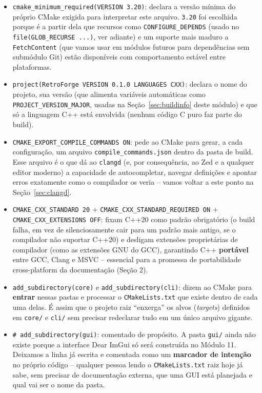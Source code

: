 \begin{itemize}
    \item \texttt{cmake\_minimum\_required(VERSION 3.20)}: declara a versão mínima do próprio CMake exigida para interpretar este arquivo. \texttt{3.20} foi escolhida porque é a partir dela que recursos como \texttt{CONFIGURE\_DEPENDS} (usado no \texttt{file(GLOB\_RECURSE ...)}, ver adiante) e um suporte mais maduro a \texttt{FetchContent} (que vamos usar em módulos futuros para dependências sem submódulo Git) estão disponíveis com comportamento estável entre plataformas.
    \item \texttt{project(RetroForge VERSION 0.1.0 LANGUAGES CXX)}: declara o nome do projeto, sua versão (que alimenta variáveis automáticas como \texttt{PROJECT\_VERSION\_MAJOR}, usadas na Seção~\ref{sec:buildinfo} deste módulo) e que só a linguagem C++ está envolvida (nenhum código C puro faz parte do build).
    \item \texttt{CMAKE\_EXPORT\_COMPILE\_COMMANDS ON}: pede ao CMake para gerar, a cada configuração, um arquivo \texttt{compile\_commands.json} dentro da pasta de build. Esse arquivo é o que dá ao \texttt{clangd} (e, por consequência, ao Zed e a qualquer editor moderno) a capacidade de autocompletar, navegar definições e apontar erros exatamente como o compilador os veria -- vamos voltar a este ponto na Seção~\ref{sec:clangd}.
    \item \texttt{CMAKE\_CXX\_STANDARD 20} + \texttt{CMAKE\_CXX\_STANDARD\_REQUIRED ON} + \texttt{CMAKE\_CXX\_EXTENSIONS OFF}: fixam C++20 como padrão obrigatório (o build falha, em vez de silenciosamente cair para um padrão mais antigo, se o compilador não suportar C++20) e desligam extensões proprietárias de compilador (como as extensões GNU do GCC), garantindo C++ \textbf{portável} entre GCC, Clang e MSVC -- essencial para a promessa de portabilidade cross-platform da documentação (Seção 2).
    \item \texttt{add\_subdirectory(core)} e \texttt{add\_subdirectory(cli)}: dizem ao CMake para \textbf{entrar} nessas pastas e processar o \texttt{CMakeLists.txt} que existe dentro de cada uma delas. É assim que o projeto raiz ``enxerga'' os alvos (\textit{targets}) definidos em \texttt{core/} e \texttt{cli/} sem precisar redeclarar tudo em um único arquivo gigante.
    \item \texttt{\# add\_subdirectory(gui)}: comentado de propósito. A pasta \texttt{gui/} ainda não existe porque a interface Dear ImGui só será construída no Módulo 11. Deixamos a linha já escrita e comentada como um \textbf{marcador de intenção} no próprio código -- qualquer pessoa lendo o \texttt{CMakeLists.txt} raiz hoje já sabe, sem precisar de documentação externa, que uma GUI está planejada e qual vai ser o nome da pasta.
\end{itemize}

